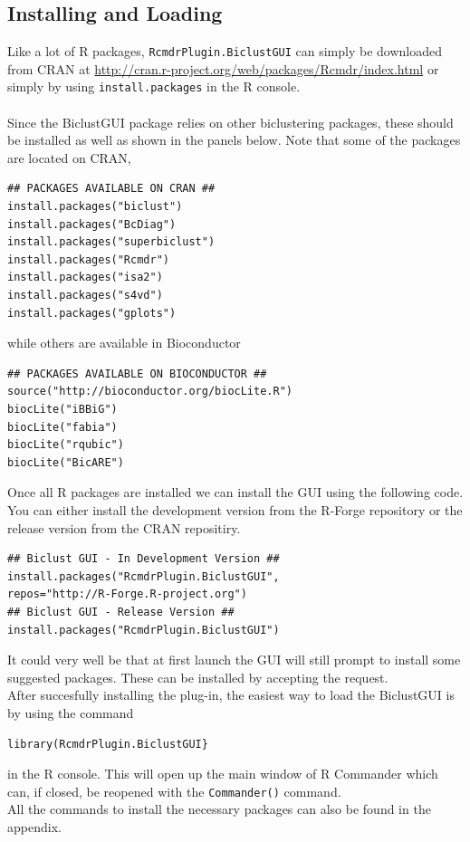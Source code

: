 \documentclass[a4paper]{article}\usepackage[]{graphicx}\usepackage[]{color}
\begin{document}
\subsection{Installing and Loading}
\noindent Like a lot of R packages, \texttt{RcmdrPlugin.BiclustGUI} can simply be downloaded
from CRAN at \url{http://cran.r-project.org/web/packages/Rcmdr/index.html} or
simply by using \verb|install.packages| in the R console. \\ \\
Since the BiclustGUI package relies on other biclustering packages, these
should be installed as well as shown in the panels below. Note that some of
the packages are located on CRAN,
\begin{verbatim}
## PACKAGES AVAILABLE ON CRAN ##
install.packages("biclust")
install.packages("BcDiag")
install.packages("superbiclust")
install.packages("Rcmdr")
install.packages("isa2")
install.packages("s4vd")
install.packages("gplots")
\end{verbatim}
\noindent while others are available in Bioconductor
\begin{verbatim}
## PACKAGES AVAILABLE ON BIOCONDUCTOR ##
source("http://bioconductor.org/biocLite.R")
biocLite("iBBiG")
biocLite("fabia")
biocLite("rqubic")
biocLite("BicARE")
\end{verbatim}
\noindent Once all R packages are installed we can install the GUI using the following
code. You can either install the development version from the R-Forge repository
or the release version from the CRAN repositiry.
\begin{verbatim}
## Biclust GUI - In Development Version ##
install.packages("RcmdrPlugin.BiclustGUI",
repos="http://R-Forge.R-project.org")
## Biclust GUI - Release Version ##
install.packages("RcmdrPlugin.BiclustGUI")
\end{verbatim}
It could very well be that at first launch the GUI will still prompt to install
some suggested packages. These can be installed by accepting the request.\\
\noindent After succesfully installing the plug-in, the easiest way to load the
BiclustGUI is by using the command
\begin{verbatim}
library(RcmdrPlugin.BiclustGUI}
\end{verbatim}
in the R console. This will open up the main window of R Commander which can, if
closed, be reopened with the \verb|Commander()| command. \\
\noindent All the commands to install the necessary packages can also be found
in the appendix.
\end{document}
